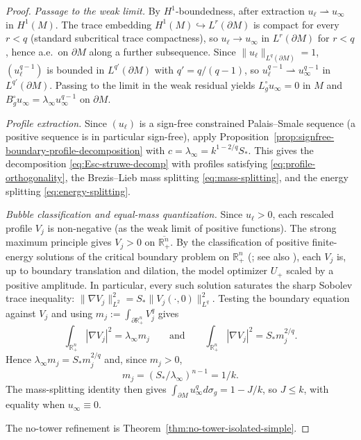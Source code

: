\documentclass[11pt,reqno,a4paper]{amsart}
\newcommand{\R}{\mathbb{R}}
\numberwithin{equation}{section}
\theoremstyle{plain}
\theoremstyle{remark}
\theoremstyle{plain}
\begin{document}
\begin{proof}
\smallskip\noindent\emph{Passage to the weak limit.}
By $H^1$-boundedness, after extraction $u_\ell\rightharpoonup u_\infty$ in $H^1(M)$.
The trace embedding $H^1(M)\hookrightarrow L^r(\partial M)$ is compact for every $r<q$
(standard subcritical trace compactness), so $u_\ell\to u_\infty$ in $L^r(\partial M)$ for $r<q$,
hence a.e.\ on $\partial M$ along a further subsequence.
Since $\|u_\ell\|_{L^q(\partial M)}=1$, $(u_\ell^{q-1})$ is bounded in $L^{q'}(\partial M)$ with
$q'=q/(q-1)$, so $u_\ell^{q-1}\rightharpoonup u_\infty^{q-1}$ in $L^{q'}(\partial M)$.
Passing to the limit in the weak residual yields
$L_g^\circ u_\infty=0$ in $M$ and $B_g^\circ u_\infty=\lambda_\infty u_\infty^{q-1}$ on $\partial M$.

\smallskip\noindent\emph{Profile extraction.}
Since $(u_\ell)$ is a sign-free constrained Palais--Smale sequence
(a positive sequence is in particular sign-free), apply
Proposition~\ref{prop:signfree-boundary-profile-decomposition} with
$c=\lambda_\infty=k^{1-2/q}S_\ast$.  This gives the decomposition
\eqref{eq:Esc-struwe-decomp} with profiles satisfying
\eqref{eq:profile-orthogonality}, the Brezis--Lieb mass splitting
\eqref{eq:mass-splitting}, and the energy splitting
\eqref{eq:energy-splitting}.

\smallskip\noindent\emph{Bubble classification and equal-mass quantization.}
Since $u_\ell>0$, each rescaled profile $V_j$ is non-negative (as the weak
limit of positive functions).  The strong maximum principle gives $V_j>0$ on
$\overline{\R^n_+}$.
By the classification of positive finite-energy solutions of the critical
boundary problem on $\R^n_+$
(\cite{LiZhu1995}; see also \cite{EscobarAnnals92,EscobarJDG92}), each $V_j$ is, up to
boundary translation and dilation, the model optimizer $U_+$ scaled by a
positive amplitude.  In particular, every such solution saturates the sharp
Sobolev trace inequality:
$\|\nabla V_j\|_{L^2}^2=S_\ast\|V_j(\cdot,0)\|_{L^q}^2$.
Testing the boundary equation against $V_j$ and using $m_j:=\int_{\partial\R^n_+}V_j^q$ gives
\[
\int_{\R^n_+}|\nabla V_j|^2=\lambda_\infty m_j
\qquad\text{and}\qquad
\int_{\R^n_+}|\nabla V_j|^2=S_\ast m_j^{2/q}.
\]
Hence $\lambda_\infty m_j=S_\ast m_j^{2/q}$ and, since $m_j>0$,
\[
m_j=(S_\ast/\lambda_\infty)^{n-1}=1/k.
\]
The mass-splitting identity then gives $\int_{\partial M}u_\infty^q d\sigma_g=1-J/k$, so $J\le k$, with equality when $u_\infty\equiv0$.

\smallskip
The no-tower refinement is Theorem~\ref{thm:no-tower-isolated-simple}.
\end{proof}
\end{document}

